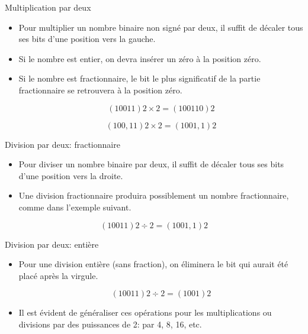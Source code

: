 \documentclass[presentation]{beamer}
\begin{document}
\begin{frame}[label={sec:org7580aad}]{Multiplication par deux}
\begin{itemize}
\item Pour multiplier un nombre binaire non signé par deux, il suffit de décaler tous ses bits d'une position vers la gauche.

\item Si le nombre est entier, on devra insérer un zéro à la position zéro.

\item Si le nombre est fractionnaire, le bit le plus significatif de la partie fractionnaire se retrouvera à la position zéro.

$$ (10011)2 \times 2 = (100110)2 $$

$$ (100,11)2 \times 2 = (1001,1)2 $$
\end{itemize}
\end{frame}

\begin{frame}[label={sec:org1eade6f}]{Division par deux: fractionnaire}
\begin{itemize}
\item Pour diviser un nombre binaire par deux, il suffit de décaler tous ses bits d'une position vers la droite.

\item Une division fractionnaire produira possiblement un nombre fractionnaire, comme dans l'exemple suivant.
\end{itemize}


$$ (10011)2 \div 2 = (1001,1)2 $$
\end{frame}

\begin{frame}[label={sec:org61339c5}]{Division par deux: entière}
\begin{itemize}
\item Pour une division entière (sans fraction), on éliminera le bit qui aurait été placé après la virgule.

$$ (10011)2 \div 2 = (1001)2 $$

\item Il est évident de généraliser ces opérations pour les multiplications ou divisions par des puissances de 2: par 4, 8, 16, etc.
\end{itemize}
\end{frame}
\end{document}

